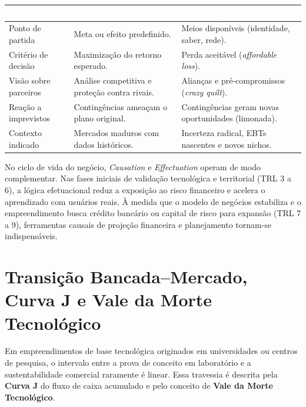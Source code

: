 \begin{center}
\renewcommand{\arraystretch}{1.22}
\small
\begin{tabularx}{\textwidth}{@{}l >{\raggedright\arraybackslash}X >{\raggedright\arraybackslash}X@{}}
  \toprule
  \rowcolor{etIndigo}
  \textcolor{white}{\bfseries Dimensão} & \textcolor{white}{\bfseries Lógica \textit{Causation}} & \textcolor{white}{\bfseries Lógica \textit{Effectuation}} \\
  \midrule
  Ponto de partida & Meta ou efeito predefinido. & Meios disponíveis (identidade, saber, rede). \\
  \rowcolor{bgGray}
  Critério de decisão & Maximização do retorno esperado. & Perda aceitável (\textit{affordable loss}). \\
  Visão sobre parceiros & Análise competitiva e proteção contra rivais. & Alianças e pré-compromissos (\textit{crazy quilt}). \\
  \rowcolor{bgGray}
  Reação a imprevistos & Contingências ameaçam o plano original. & Contingências geram novas oportunidades (limonada). \\
  Contexto indicado & Mercados maduros com dados históricos. & Incerteza radical, EBTs nascentes e novos nichos. \\
  \bottomrule
\end{tabularx}
\end{center}

No ciclo de vida do negócio, \textit{Causation} e \textit{Effectuation} operam de modo complementar. Nas fases iniciais de validação tecnológica e territorial (TRL 3 a 6), a lógica efetuacional reduz a exposição ao risco financeiro e acelera o aprendizado com usuários reais. À medida que o modelo de negócios estabiliza e o empreendimento busca crédito bancário ou capital de risco para expansão (TRL 7 a 9), ferramentas causais de projeção financeira e planejamento tornam-se indispensáveis.

\section{Transição Bancada–Mercado, Curva J e Vale da Morte Tecnológico}

Em empreendimentos de base tecnológica originados em universidades ou centros de pesquisa, o intervalo entre a prova de conceito em laboratório e a sustentabilidade comercial raramente é linear. Essa travessia é descrita pela \textbf{Curva J} do fluxo de caixa acumulado e pelo conceito de \textbf{Vale da Morte Tecnológico}.

